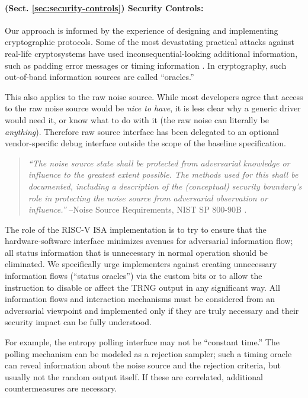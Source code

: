     \paragraph{(Sect. \ref{sec:security-controls}) Security Controls:}
    Our approach is informed by the experience of designing and implementing
    cryptographic protocols. Some of the most devastating practical attacks
    against real-life cryptosystems have used inconsequential-looking
    additional information, such as padding error messages \cite{BaFoKa+12}
    or timing information \cite{MoSuEi+20}. In cryptography, such
    out-of-band information sources  are called ``oracles.''

    This also applies to the raw noise source. While most developers agree
    that access to the raw noise source would be \emph{nice to have},
    it is less clear why a generic driver would need it, or know what to
    do with it (the raw noise can literally be \emph{anything}).
    Therefore raw source interface has been delegated to an optional
    vendor-specific debug interface outside the scope of the baseline
    specification.

    \begin{quote}
    {\it ``The noise source state shall be protected from adversarial
        knowledge or influence to the greatest extent possible. The methods
        used for this shall be documented, including a description of the
        (conceptual) security boundary’s role in protecting the noise source
        from adversarial observation or influence.''}
    \flushright --Noise Source Requirements, NIST SP 800-90B \cite{TuBaKe+18}.
    \end{quote}

    The role of the RISC-V ISA implementation is to try to ensure that the
    hardware-software interface minimizes avenues for adversarial information
    flow; all status information that is unnecessary in normal operation
    should be eliminated. We specifically urge implementers against creating
    unnecessary information flows (``status oracles'') via the custom bits
    or to allow the instruction to disable or affect the TRNG output in any
    significant way. All information flows and interaction mechanisms must
    be considered from an adversarial viewpoint and implemented only if they
    are truly necessary and their security impact can be fully understood.

    For example, the entropy polling interface may not be ``constant time.''
    The polling mechanism can be modeled as a rejection sampler; such a
    timing oracle can reveal information about the noise source and the
    rejection criteria, but usually not the random output itself.
    If these are correlated, additional countermeasures are necessary.

